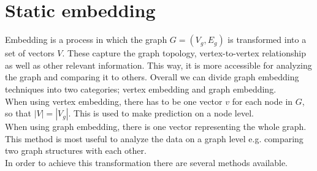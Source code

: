 \documentclass[sigconf]{acmart}
\begin{document}
\section{Static embedding}
Embedding is a process in which the graph \(G = (V_g, E_g)\) is transformed into a set of vectors \(V\).
These capture the graph topology, vertex-to-vertex relationship as well as other relevant information.
This way, it is more accessible for analyzing the graph and comparing it to others.
Overall we can divide graph embedding techniques into two categories; 
vertex embedding and graph embedding. \\
When using vertex embedding, there has to be one vector \(v\) for each node in \(G\), so that \(|V| = |V_g|\). This is used to make prediction 
on a node level.\\
When using graph embedding, there is one vector representing the whole graph. This method is most useful to analyze the data on a graph level e.g.
comparing two graph structures with each other.\\
In order to achieve this transformation there are several methods available.
\end{document}
